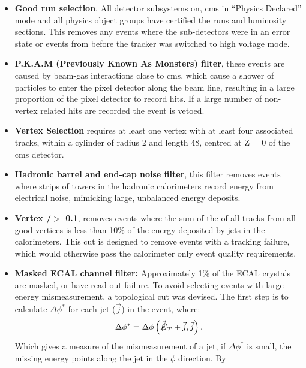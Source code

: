 \begin{itemize}
\item \textbf{Good run selection}, All detector subsystems on, \ac{cms} in 
``Physics Declared'' mode and all physics object groups have certified the runs 
and luminosity sections. This removes any events where the sub-detectors were 
in an error state or events from before the tracker was switched to high 
voltage mode.
\item \textbf{P.K.A.M (Previously Known As Monsters) filter}, these events are 
caused by beam-gas interactions close to \ac{cms}, which cause a shower of 
particles to enter the pixel detector along the beam line, resulting in a large 
proportion of the pixel detector to record hits. If a large number of non-vertex related hits are recorded the event is vetoed.
\item \textbf{Vertex Selection} requires at least one vertex with at 
least four associated tracks, within a cylinder of radius \unit{2}{\cm} and 
length \unit{48}{\cm}, centred at Z = 0 of the \ac{cms} detector.
\item \textbf{Hadronic barrel and end-cap noise filter}, this filter removes 
events where strips of towers in the hadronic calorimeters record energy from 
electrical noise, mimicking large, unbalanced energy deposits.
\item \textbf{Vertex \PT/\HT $>$ 0.1}, removes events where the sum of the 
\PT of all tracks from all good vertices is less than 10$\%$ of the energy 
deposited by jets in the calorimeters. This cut is designed to remove events 
with a tracking failure, which would otherwise pass the calorimeter only event 
quality requirements.
\item\textbf{Masked ECAL channel filter:} Approximately 1$\%$ of the ECAL 
crystals are masked, or have read out failure. To avoid selecting events with 
large energy mismeasurement, a topological cut was devised. The first step is 
to calculate $\Delta\phi^{*}$ for each jet ($\vec{j}$) in the event, where:
\begin{equation}
  \Delta\phi^{*} = \Delta\phi\left(\vec{\slashed{E}}_{T}+\vec{j},\vec{j} \right).
  \label{eq:biasedDphi}
\end{equation}
Which gives a measure of the mismeasurement of a jet, if $\Delta\phi^{*}$ is 
small, the missing energy points along the jet in the $\phi$ direction. By 

\end{itemize}
